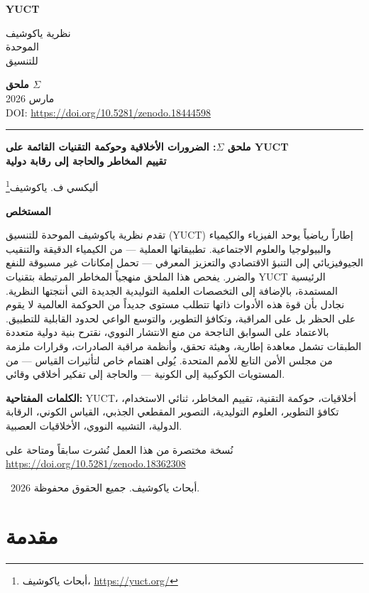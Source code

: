 \documentclass[12pt,a4paper]{article}
\theoremstyle{remark}
\newcommand{\makeheader}{%
	\noindent
	\begin{minipage}{0.17\textwidth}
		\raggedright
		{\sffamily\bfseries\color{skyblue}\fontsize{46}{46}\selectfont YUCT}%
	\end{minipage}%
	\hspace{30pt}
	\begin{minipage}{0.32\textwidth}
		\raggedright
		{\sffamily\fontsize{11}{13}\selectfont نظرية ياكوشيف\\ الموحدة\\ للتنسيق}%
	\end{minipage}%
	\hfill
	\begin{minipage}{0.38\textwidth}
		\raggedleft
		{\sffamily\bfseries ملحق \(\Sigma\)}\\
		{\sffamily مارس 2026}\\
		{\sffamily\footnotesize \scriptsize DOI: \url{https://doi.org/10.5281/zenodo.18444598}}%
	\end{minipage}
	\par\vspace{5pt}
	\noindent\textcolor{gold}{\rule{\textwidth}{1.6pt}}
	\par\vspace{0pt}
}
\begin{document}
	\thispagestyle{firstpage}
	\makeheader
	
	\vspace{0cm}
	{\LARGE\bfseries ملحق \(\Sigma\): الضرورات الأخلاقية وحوكمة التقنيات القائمة على YUCT \\
		\Large تقييم المخاطر والحاجة إلى رقابة دولية \par}
	\vspace{0.2cm}
	
	{\large أليكسي ف. ياكوشيف\footnote{أبحاث ياكوشيف، \url{https://yuct.org/}}} \\
	\vspace{0.0cm}
	
	{\color{darkblue}\textbf{\LARGE المستخلص}} \par
	{\large
		\noindent
		تقدم نظرية ياكوشيف الموحدة للتنسيق (YUCT) إطاراً رياضياً يوحد الفيزياء والكيمياء والبيولوجيا والعلوم الاجتماعية. تطبيقاتها العملية — من الكيمياء الدقيقة والتنقيب الجيوفيزيائي إلى التنبؤ الاقتصادي والتعزيز المعرفي — تحمل إمكانات غير مسبوقة للنفع والضرر. يفحص هذا الملحق منهجياً المخاطر المرتبطة بتقنيات YUCT الرئيسية المستمدة، بالإضافة إلى التخصصات العلمية التوليدية الجديدة التي أنتجتها النظرية. نجادل بأن قوة هذه الأدوات ذاتها تتطلب مستوى جديداً من الحوكمة العالمية لا يقوم على الحظر بل على المراقبة، وتكافؤ التطوير، والتوسع الواعي لحدود القابلية للتطبيق. بالاعتماد على السوابق الناجحة من منع الانتشار النووي، نقترح بنية دولية متعددة الطبقات تشمل معاهدة إطارية، وهيئة تحقق، وأنظمة مراقبة الصادرات، وقرارات ملزمة من مجلس الأمن التابع للأمم المتحدة. يُولى اهتمام خاص لتأثيرات القياس — من المستويات الكوكبية إلى الكونية — والحاجة إلى تفكير أخلاقي وقائي.
	}
	
	\vspace{0.1cm}
	\noindent
	{\color{darkblue}\textbf{الكلمات المفتاحية:}} YUCT، أخلاقيات، حوكمة التقنية، تقييم المخاطر، ثنائي الاستخدام، تكافؤ التطوير، العلوم التوليدية، التصوير المقطعي الجذبي، القياس الكوني، الرقابة الدولية، التشبيه النووي، الأخلاقيات العصبية.
	
	\vspace{0.5cm}
	\noindent
	{\small نُسخة مختصرة من هذا العمل نُشرت سابقاً ومتاحة على \\ \url{https://doi.org/10.5281/zenodo.18362308}}
	\vspace{0.5cm}
	
	\noindent
	\textcopyright\ 2026 أبحاث ياكوشيف. جميع الحقوق محفوظة.
	
	\tableofcontents
	\newpage
	
	\section{مقدمة}
	\label{sec:intro}
	
\end{document}

